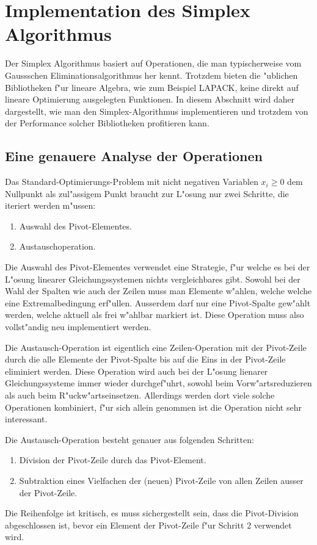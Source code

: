 \chapter{Implementation des Simplex Algorithmus}
Der Simplex Algorithmus basiert auf Operationen, die man typischerweise
vom Gaussschen Eliminationsalgorithmus her kennt.
Trotzdem bieten die "ublichen Bibliotheken f"ur lineare Algebra,
wie zum Beispiel LAPACK, keine direkt auf lineare Optimierung
ausgelegten Funktionen.
In diesem Abschnitt wird daher dargestellt, wie man den Simplex-Algorithmus
implementieren und trotzdem von der Performance solcher
Bibliotheken profitieren kann.

\section{Eine genauere Analyse der Operationen}
Das Standard-Optimierungs-Problem mit nicht negativen Variablen $x_i\ge 0$
dem Nullpunkt als zul"assigem Punkt braucht zur L"osung nur zwei Schritte,
die iteriert werden m"ussen:
\begin{enumerate}
\item Auswahl des Pivot-Elementes.
\item Austauschoperation.
\end{enumerate}
Die Auswahl des Pivot-Elementes verwendet eine Strategie, f"ur welche es
bei der L"osung linearer Gleichungssystemen nichts vergleichbares gibt.
Sowohl bei der Wahl der Spalten wie auch der Zeilen muss man Elemente 
w"ahlen, welche welche eine Extremalbedingung erf"ullen. Ausserdem
darf nur eine Pivot-Spalte gew"ahlt werden, welche aktuell als
frei w"ahlbar markiert ist. Diese Operation muss also vollst"andig neu
implementiert werden.

Die Austausch-Operation ist eigentlich eine Zeilen-Operation mit der
Pivot-Zeile durch die alle Elemente der Pivot-Spalte bis auf die Eins
in der Pivot-Zeile eliminiert werden. Diese Operation wird auch
bei der L"osung lienarer Gleichungssysteme immer wieder durchgef"uhrt,
sowohl beim Vorw"artsreduzieren als auch beim R"uckw"artseinsetzen.
Allerdings werden dort viele solche Operationen kombiniert, f"ur sich
allein genommen ist die Operation nicht sehr interessant.

Die Austausch-Operation besteht genauer aus folgenden Schritten:
\begin{enumerate}
\item Division der Pivot-Zeile durch das Pivot-Element.
\item Subtraktion eines Vielfachen der (neuen) Pivot-Zeile von allen
Zeilen ausser der Pivot-Zeile.
\end{enumerate}
Die Reihenfolge ist kritisch, es muss sichergestellt sein, dass die
Pivot-Division abgeschlossen ist, bevor ein Element der Pivot-Zeile
f"ur Schritt 2 verwendet wird.

